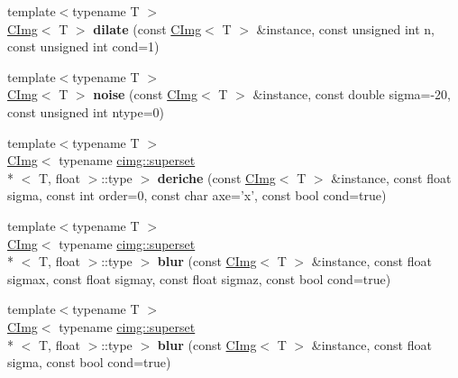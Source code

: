 \begin{DoxyCompactItemize}
\item 
\hypertarget{namespacecimg__library_a7908062db7c565bd93300a31e4c610a2}{{\footnotesize template$<$typename T $>$ }\\\hyperlink{structcimg__library_1_1_c_img}{C\-Img}$<$ T $>$ {\bfseries dilate} (const \hyperlink{structcimg__library_1_1_c_img}{C\-Img}$<$ T $>$ \&instance, const unsigned int n, const unsigned int cond=1)}\label{namespacecimg__library_a7908062db7c565bd93300a31e4c610a2}

\item 
\hypertarget{namespacecimg__library_a5d62d30c9c9ae0d2ef20f0035c5c0a4c}{{\footnotesize template$<$typename T $>$ }\\\hyperlink{structcimg__library_1_1_c_img}{C\-Img}$<$ T $>$ {\bfseries noise} (const \hyperlink{structcimg__library_1_1_c_img}{C\-Img}$<$ T $>$ \&instance, const double sigma=-\/20, const unsigned int ntype=0)}\label{namespacecimg__library_a5d62d30c9c9ae0d2ef20f0035c5c0a4c}

\item 
\hypertarget{namespacecimg__library_a480f278ce5c21b40c4c00f46d2b3af8b}{{\footnotesize template$<$typename T $>$ }\\\hyperlink{structcimg__library_1_1_c_img}{C\-Img}$<$ typename \hyperlink{structcimg__library_1_1cimg_1_1superset}{cimg\-::superset}\\*
$<$ T, float $>$\-::type $>$ {\bfseries deriche} (const \hyperlink{structcimg__library_1_1_c_img}{C\-Img}$<$ T $>$ \&instance, const float sigma, const int order=0, const char axe='x', const bool cond=true)}\label{namespacecimg__library_a480f278ce5c21b40c4c00f46d2b3af8b}

\item 
\hypertarget{namespacecimg__library_a280907fb995d144168d826a44e16bf93}{{\footnotesize template$<$typename T $>$ }\\\hyperlink{structcimg__library_1_1_c_img}{C\-Img}$<$ typename \hyperlink{structcimg__library_1_1cimg_1_1superset}{cimg\-::superset}\\*
$<$ T, float $>$\-::type $>$ {\bfseries blur} (const \hyperlink{structcimg__library_1_1_c_img}{C\-Img}$<$ T $>$ \&instance, const float sigmax, const float sigmay, const float sigmaz, const bool cond=true)}\label{namespacecimg__library_a280907fb995d144168d826a44e16bf93}

\item 
\hypertarget{namespacecimg__library_aa575c48d43e6324ccb2f748513523353}{{\footnotesize template$<$typename T $>$ }\\\hyperlink{structcimg__library_1_1_c_img}{C\-Img}$<$ typename \hyperlink{structcimg__library_1_1cimg_1_1superset}{cimg\-::superset}\\*
$<$ T, float $>$\-::type $>$ {\bfseries blur} (const \hyperlink{structcimg__library_1_1_c_img}{C\-Img}$<$ T $>$ \&instance, const float sigma, const bool cond=true)}\label{namespacecimg__library_aa575c48d43e6324ccb2f748513523353}


\end{DoxyCompactItemize}
